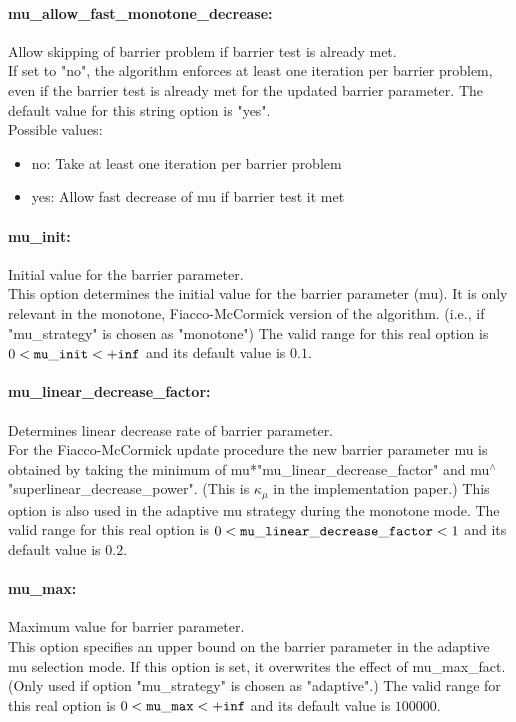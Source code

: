 \paragraph{mu\_allow\_fast\_monotone\_decrease:}\label{sec:mu_allow_fast_monotone_decrease} Allow skipping of barrier problem if barrier test is already met. $\;$ \\
 If set to "no", the algorithm enforces at least
one iteration per barrier problem, even if the
barrier test is already met for the updated
barrier parameter.
The default value for this string option is "yes".
\\ 
Possible values:
\begin{itemize}
   \item no: Take at least one iteration per barrier problem
   \item yes: Allow fast decrease of mu if barrier test it met
\end{itemize}

\paragraph{mu\_init:}\label{sec:mu_init} Initial value for the barrier parameter. $\;$ \\
 This option determines the initial value for the
barrier parameter (mu).  It is only relevant in
the monotone, Fiacco-McCormick version of the
algorithm. (i.e., if "mu\_strategy" is chosen as
"monotone") The valid range for this real option is 
$0 <  {\tt mu\_init } <  {\tt +inf}$
and its default value is $0.1$.


\paragraph{mu\_linear\_decrease\_factor:}\label{sec:mu_linear_decrease_factor} Determines linear decrease rate of barrier parameter. $\;$ \\
 For the Fiacco-McCormick update procedure the new
barrier parameter mu is obtained by taking the
minimum of mu*"mu\_linear\_decrease\_factor" and
mu$^\wedge$"superlinear\_decrease\_power".  (This is
$\kappa_\mu$ in the implementation paper.) This option
is also used in the adaptive mu strategy during
the monotone mode. The valid range for this real option is 
$0 <  {\tt mu\_linear\_decrease\_factor } <  1$
and its default value is $0.2$.


\paragraph{mu\_max:}\label{sec:mu_max} Maximum value for barrier parameter. $\;$ \\
 This option specifies an upper bound on the
barrier parameter in the adaptive mu selection
mode.  If this option is set, it overwrites the
effect of mu\_max\_fact. (Only used if option
"mu\_strategy" is chosen as "adaptive".) The valid range for this real option is 
$0 <  {\tt mu\_max } <  {\tt +inf}$
and its default value is $100000$.



